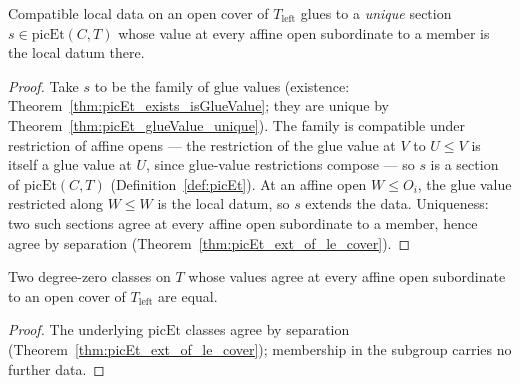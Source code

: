 \begin{theorem}
  \label{thm:picEt_existsUnique_glue_of_le_cover}
  \leanok
  Compatible local data on an open cover of \(T_{\mathrm{left}}\) glues to a \emph{unique}
  section \(s \in \mathrm{picEt}(C,T)\) whose value at every affine open subordinate to a
  member is the local datum there.
\end{theorem}
\begin{proof}
  \leanok
  Take \(s\) to be the family of glue values (existence:
  Theorem~\ref{thm:picEt_exists_isGlueValue}; they are unique by
  Theorem~\ref{thm:picEt_glueValue_unique}). The family is compatible under restriction of
  affine opens — the restriction of the glue value at \(V\) to \(U \le V\) is itself a glue
  value at \(U\), since glue-value restrictions compose — so \(s\) is a section of
  \(\mathrm{picEt}(C,T)\) (Definition~\ref{def:picEt}). At an affine open \(W \le O_i\), the
  glue value restricted along \(W \le W\) is the local datum, so \(s\) extends the data.
  Uniqueness: two such sections agree at every affine open subordinate to a member, hence
  agree by separation (Theorem~\ref{thm:picEt_ext_of_le_cover}).
\end{proof}

\begin{theorem}
  \label{thm:pic0Subgroup_ext_of_le_cover}
  \leanok
  Two degree-zero classes on \(T\) whose values agree at every affine open subordinate to an
  open cover of \(T_{\mathrm{left}}\) are equal.
\end{theorem}
\begin{proof}
  \leanok
  The underlying \(\mathrm{picEt}\) classes agree by separation
  (Theorem~\ref{thm:picEt_ext_of_le_cover}); membership in the subgroup carries no further
  data.
\end{proof}

